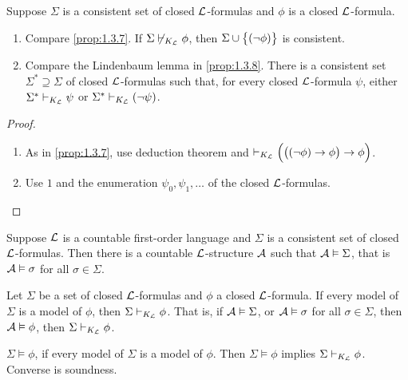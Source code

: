 \begin{proposition}
\label{prop:2.5.2}
Suppose $ \Sigma $ is a consistent set of closed $ \LL $-formulas and $ \phi $ is a closed $ \LL $-formula.
\begin{enumerate}
\item Compare \ref{prop:1.3.7}. If $ \Sigma \not\vdash_{K_\LL} \phi $, then $ \Sigma \cup \cbr{\notb{\phi}} $ is consistent.
\item Compare the Lindenbaum lemma in \ref{prop:1.3.8}. There is a consistent set $ \Sigma^* \supseteq \Sigma $ of closed $ \LL $-formulas such that, for every closed $ \LL $-formula $ \psi $, either $ \Sigma^* \vdash_{K_\LL} \psi $ or $ \Sigma^* \vdash_{K_\LL} \notb{\psi} $.
\end{enumerate}
\end{proposition}

\begin{proof}
\hfill
\begin{enumerate}
\item As in \ref{prop:1.3.7}, use deduction theorem and $ \vdash_{K_\LL} \impb{\impb{\notb{\phi}}{\phi}}{\phi} $.
\item Use $ 1 $ and the enumeration $ \psi_0, \psi_1, \dots $ of the closed $ \LL $-formulas.
\end{enumerate}
\end{proof}

\pagebreak

\begin{theorem}
\label{thm:2.5.3}
Suppose $ \LL $ is a countable first-order language and $ \Sigma $ is a consistent set of closed $ \LL $-formulas. Then there is a countable $ \LL $-structure $ \AA $ such that $ \AA \vDash \Sigma $, that is $ \AA \vDash \sigma $ for all $ \sigma \in \Sigma $.
\end{theorem}

\begin{theorem}
\label{thm:2.5.4}
Let $ \Sigma $ be a set of closed $ \LL $-formulas and $ \phi $ a closed $ \LL $-formula. If every model of $ \Sigma $ is a model of $ \phi $, then $ \Sigma \vdash_{K_\LL} \phi $. That is, if $ \AA \vDash \Sigma $, or $ \AA \vDash \sigma $ for all $ \sigma \in \Sigma $, then $ \AA \vDash \phi $, then $ \Sigma \vdash_{K_\LL} \phi $.
\end{theorem}

\begin{notation*}
$ \Sigma \vDash \phi $, if every model of $ \Sigma $ is a model of $ \phi $. Then $ \Sigma \vDash \phi $ implies $ \Sigma \vdash_{K_\LL} \phi $. Converse is soundness.
\end{notation*}

